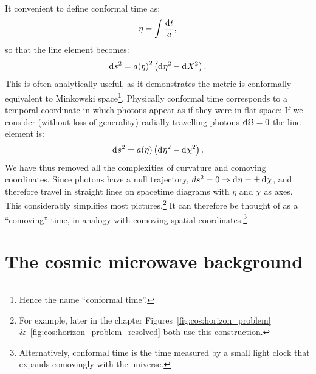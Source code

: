 It convenient to define conformal time as:
\begin{equation}
  \eta = \int \frac{\operatorname{d}^{}\!{t}}{a},
  \label{eqn:cos:conformal_time}
\end{equation}
so that the line element becomes:
\begin{equation}          
  \operatorname{d}^{}\!{s}^2 = {a(\eta)}^2\left( \operatorname{d}^{}\!{\eta}^2 - \operatorname{d}^{}\!{X}^2 \right).
  \label{eqn:cos:flat_FRW}
\end{equation}
This is often analytically useful, as it demonstrates the metric is conformally equivalent to Minkowski space\footnote{Hence the name ``conformal time''.}. Physically conformal time corresponds to a temporal coordinate in which photons appear as if they were in flat space: If we consider (without loss of generality) radially travelling photons \(\operatorname{d}^{}\!{\Omega}=0\) the line element is:
\begin{equation}          
  \operatorname{d}^{}\!{s}^2 = a(\eta)\left( \operatorname{d}^{}\!{\eta}^2 - \operatorname{d}^{}\!{\chi}^2 \right).
  \label{eqn:cos:flat_FRW_radial}
\end{equation}
We have thus removed all the complexities of curvature and comoving coordinates. Since photons have a null trajectory, \(ds^2=0\Rightarrow \operatorname{d}^{}\!{\eta} = \pm \operatorname{d}^{}\!{\chi}\), and therefore  travel in straight lines on spacetime diagrams with \(\eta\) and \(\chi\) as axes. This considerably simplifies most pictures.\footnote{For example, later in the chapter Figures~\protect\ref{fig:cos:horizon_problem} \&~\protect\ref{fig:cos:horizon_problem_resolved} both use this construction.}  It can therefore be thought of as a ``comoving'' time, in analogy with comoving spatial coordinates.\footnote{Alternatively, conformal time is the time measured by a small light clock that expands comovingly with the universe.}

\section{The cosmic microwave background}

